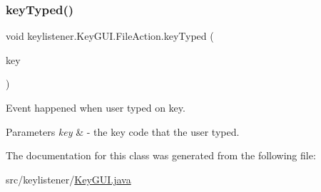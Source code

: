 \subsubsection{\texorpdfstring{key\+Typed()}{keyTyped()}}
{\footnotesize\ttfamily void keylistener.\+Key\+G\+U\+I.\+File\+Action.\+key\+Typed (\begin{DoxyParamCaption}\item[{Key\+Event}]{key }\end{DoxyParamCaption})\hspace{0.3cm}{\ttfamily [inline]}}

Event happened when user typed on key. 
\begin{DoxyParams}{Parameters}
{\em key} & -\/ the key code that the user typed. \\
\hline
\end{DoxyParams}


The documentation for this class was generated from the following file\+:\begin{DoxyCompactItemize}
\item 
src/keylistener/\hyperlink{_key_g_u_i_8java}{Key\+G\+U\+I.\+java}\end{DoxyCompactItemize}
